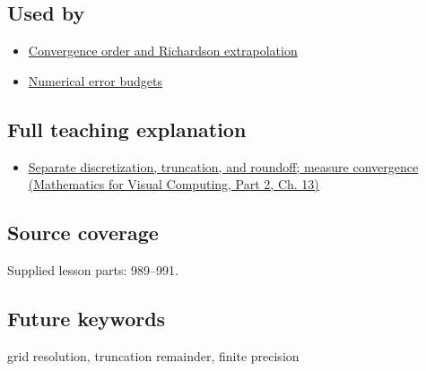 \subsection{Used by}\label{appendix-6b0648b2b8e8-used-by}

\hypertarget{appendix-6b0648b2b8e8-used-by}{}

\begin{itemize}
\tightlist
\item
  \hyperref[appendix-aca80b6bf17a]{Convergence order and Richardson extrapolation}
\item
  \hyperref[appendix-31b8c295e05f]{Numerical error budgets}
\end{itemize}

\subsection{Full teaching explanation}\label{appendix-6b0648b2b8e8-full-teaching-explanation}

\hypertarget{appendix-6b0648b2b8e8-full-teaching-explanation}{}

\begin{itemize}
\tightlist
\item
  \href{../02-Mathematics-for-Visual-Computing-P02/main.pdf\#nameddest=02-foundations-ii-ch029-separate-discretization-truncation-and-roundoff-measure-convergence}{Separate discretization, truncation, and roundoff; measure convergence (Mathematics for Visual Computing, Part 2, Ch. 13)}
\end{itemize}

\subsection{Source coverage}\label{appendix-6b0648b2b8e8-source-coverage}

\hypertarget{appendix-6b0648b2b8e8-source-coverage}{}

Supplied lesson parts: 989--991.

\subsection{Future keywords}\label{appendix-6b0648b2b8e8-future-keywords}

\hypertarget{appendix-6b0648b2b8e8-future-keywords}{}

grid resolution, truncation remainder, finite precision
